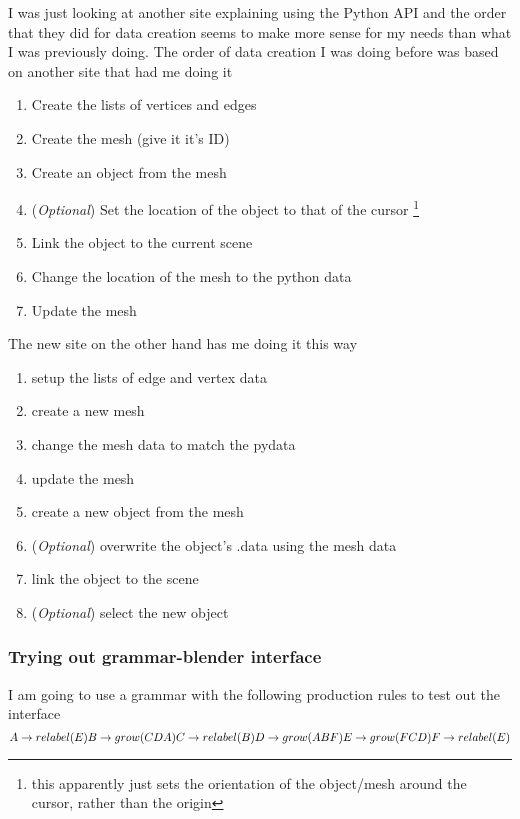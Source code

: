 \documentclass[letterpaper,oneside,titlepage]{article}
\begin{document}
I was just looking at another site explaining using the Python API and the order that they did for data creation seems to make more sense for my needs than what I was previously doing.  The order of data creation I was doing before was based on another site that had me doing it
\begin{enumerate}
\item Create the lists of vertices and edges
\item Create the mesh (give it it's ID)
\item Create an object from the mesh
\item (\emph{Optional}) Set the location of the object to that of the cursor \footnote{this apparently just sets the orientation of the object/mesh around the cursor, rather than the origin}
\item Link the object to the current scene
\item Change the location of the mesh to the python data
\item Update the mesh
\end{enumerate}
The new site on the other hand has me doing it this way
\begin{enumerate}
\item setup the lists of edge and vertex data
\item create a new mesh
\item change the mesh data to match the pydata
\item update the mesh
\item create a new object from the mesh
\item (\emph{Optional}) overwrite the object's .data using the mesh data
\item link the object to the scene
\item (\emph{Optional}) select the new object
\end{enumerate}

\subsubsection{Trying out grammar-blender interface}
I am going to use a grammar with the following production rules to test out the interface
\begin{displaymath}
  A \to relabel(E) \\
  B \to grow(CDA)  \\
  C \to relabel(B) \\
  D \to grow(ABF)  \\
  E \to grow(FCD)  \\
  F \to relabel(E)
\end{displaymath}
\end{document}
